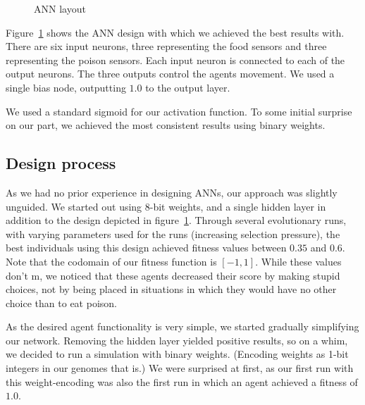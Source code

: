 \documentclass[twoside]{article}
\begin{document}
\begin{multicols}{2}
\begin{figure}[H]

    \caption{ANN layout} \label{fig:ann-layout}
  \end{figure}

  Figure~\ref{fig:ann-layout} shows the ANN design with which we achieved the best results with.
  There are six input neurons, three representing the food sensors and three representing the poison sensors.
  Each input neuron is connected to each of the output neurons.
  The three outputs control the agents movement.
  We used a single bias node, outputting $1.0$ to the output layer.

  We used a standard sigmoid for our activation function.
  To some initial surprise on our part, we achieved the most consistent results using binary weights.

  \subsection{Design process}

  As we had no prior experience in designing ANNs, our approach was slightly unguided.
  We started out using 8-bit weights, and a single hidden layer in addition to the design depicted in figure~\ref{fig:ann-layout}.
  Through several evolutionary runs, with varying parameters used for the runs (increasing selection pressure), the best individuals using this design achieved fitness values between $0.35$ and $0.6$.
  Note that the codomain of our fitness function is $[-1, 1]$.
  While these values don't m, we noticed that these agents decreased their score by making stupid choices, not by being placed in situations in which they would have no other choice than to eat poison.

  As the desired agent functionality is very simple, we started gradually simplifying our network.
  Removing the hidden layer yielded positive results, so on a whim, we decided to run a simulation with binary weights.
  (Encoding weights as 1-bit integers in our genomes that is.)
  We were surprised at first, as our first run with this weight-encoding was also the first run in which an agent achieved a fitness of $1.0$.


\end{multicols}
\end{document}
